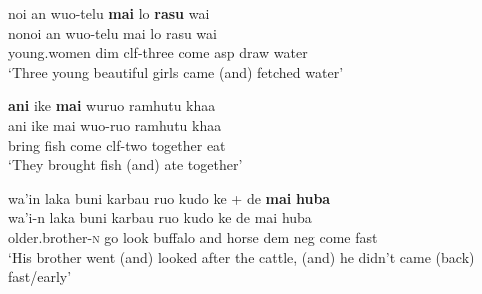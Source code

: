 \pex \label{WMH_Julio_goat099_2}
\ea
\gll noi an wuo-telu \textbf{mai} lo \textbf{rasu} wai \\
nonoi an wuo-telu mai lo rasu wai \\
\glc young.women \acs{dim} \acs{clf}-three come \acs{asp} draw water\\
\glft `Three young beautiful girls came (and) fetched water' \ 
\z
\xe

\pex \label{WMH_Julio_goat049_2}
\ea
\gll \textbf{ani} ike \textbf{mai} wuruo ramhutu khaa \\
ani ike mai wuo-ruo ramhutu khaa \\
\glc bring fish come \acs{clf}-two together eat\\
\glft `They brought fish (and) ate together' \ 
\z
\xe

\pex \label{WMH_Julio_goat057_2}
\ea%
\gll wa'in laka buni karbau ruo kudo ke + de \textbf{mai} \textbf{huba} \\
wa'i-n laka buni karbau ruo kudo ke de mai huba \\
\glc older.brother-\textsc{n} go look buffalo and horse \acs{dem} \acs{neg} come fast\\
\glft `His brother went (and) looked after the cattle, (and) he didn't came (back) fast/early' \ 
\z
\xe

